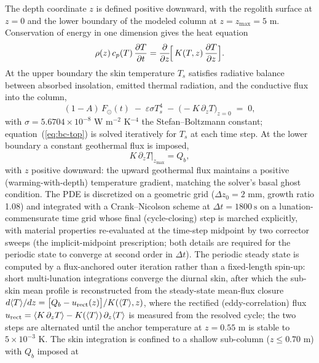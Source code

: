 \documentclass[11pt]{article}
\begin{document}
The depth coordinate $z$ is defined positive downward, with the regolith
surface at $z=0$ and the lower boundary of the modeled column at
$z=z_\mathrm{max}=5$ m. Conservation of energy in one dimension gives the
heat equation
\begin{equation}
\rho(z)\,c_p(T)\,\frac{\partial T}{\partial t}
   = \frac{\partial}{\partial z}\!\Bigl[\,K(T,z)\,\frac{\partial T}{\partial z}\Bigr].
\label{eq:heat}
\end{equation}
At the upper boundary the skin temperature $T_s$ satisfies radiative
balance between absorbed insolation, emitted thermal radiation, and the
conductive flux into the column,
\begin{equation}
(1-A)\,F_\odot(t)\;-\;\varepsilon\sigma T_s^4
\;-\;\bigl(-K\,\partial_z T\bigr)_{\!z=0} \;=\; 0,
\label{eq:bc-top}
\end{equation}
with $\sigma=5.6704\times10^{-8}$ W m$^{-2}$ K$^{-4}$ the Stefan--Boltzmann
constant; equation~(\ref{eq:bc-top}) is solved iteratively
for $T_s$ at each time step. At the lower boundary a constant geothermal
flux is imposed,
\begin{equation}
K\,\partial_z T\big|_{z_\mathrm{max}} = Q_b,
\label{eq:bc-bot}
\end{equation}
with $z$ positive downward: the upward geothermal flux maintains a
positive (warming-with-depth) temperature gradient, matching the solver's
basal ghost condition. The PDE is discretized on a geometric grid ($\Delta z_0=2$ mm, growth ratio
1.08) and integrated with a Crank--Nicolson scheme at
$\Delta t = \SI{1800}{\second}$ on a lunation-commensurate time grid whose
final (cycle-closing) step is marched explicitly, with material properties
re-evaluated at the time-step midpoint by two corrector sweeps
(the implicit-midpoint prescription; both details are required for the
periodic state to converge at second order in $\Delta t$).
The periodic steady state is computed by a flux-anchored outer
iteration rather than a fixed-length spin-up: short multi-lunation
integrations converge the diurnal skin, after which the sub-skin
mean profile is reconstructed from the steady-state mean-flux closure
$d\langle T\rangle/dz=\bigl[Q_b-u_{\rm rect}(z)\bigr]/K(\langle
T\rangle,z)$, where the rectified (eddy-correlation) flux
$u_{\rm rect}=\langle K\,\partial_z T\rangle-K(\langle
T\rangle)\,\partial_z\langle T\rangle$ is measured from the resolved
cycle; the two steps are alternated until the anchor temperature at
$z=0.55$ m is stable to $5\times10^{-3}$ K. The skin integration is
confined to a shallow sub-column ($z\le 0.70$ m) with $Q_b$ imposed at
\end{document}
